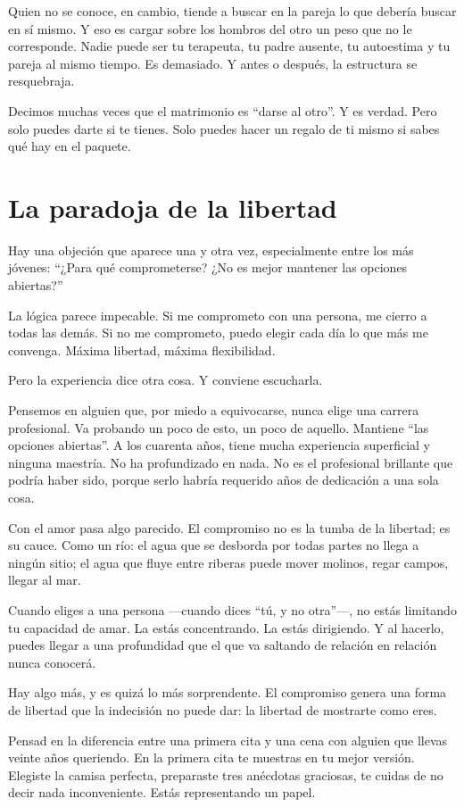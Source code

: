 Quien no se conoce, en cambio, tiende a buscar en la pareja lo que debería buscar en sí mismo. Y eso es cargar sobre los hombros del otro un peso que no le corresponde. Nadie puede ser tu terapeuta, tu padre ausente, tu autoestima y tu pareja al mismo tiempo. Es demasiado. Y antes o después, la estructura se resquebraja.

Decimos muchas veces que el matrimonio es ``darse al otro''. Y es verdad. Pero solo puedes darte si te tienes. Solo puedes hacer un regalo de ti mismo si sabes qué hay en el paquete.

\section{La paradoja de la libertad}

Hay una objeción que aparece una y otra vez, especialmente entre los más jóvenes: ``¿Para qué comprometerse? ¿No es mejor mantener las opciones abiertas?''

La lógica parece impecable. Si me comprometo con una persona, me cierro a todas las demás. Si no me comprometo, puedo elegir cada día lo que más me convenga. Máxima libertad, máxima flexibilidad.

Pero la experiencia dice otra cosa. Y conviene escucharla.

Pensemos en alguien que, por miedo a equivocarse, nunca elige una carrera profesional. Va probando un poco de esto, un poco de aquello. Mantiene ``las opciones abiertas''. A los cuarenta años, tiene mucha experiencia superficial y ninguna maestría. No ha profundizado en nada. No es el profesional brillante que podría haber sido, porque serlo habría requerido años de dedicación a una sola cosa.

Con el amor pasa algo parecido. El compromiso no es la tumba de la libertad; es su cauce. Como un río: el agua que se desborda por todas partes no llega a ningún sitio; el agua que fluye entre riberas puede mover molinos, regar campos, llegar al mar.

Cuando eliges a una persona ---cuando dices ``tú, y no otra''---, no estás limitando tu capacidad de amar. La estás concentrando. La estás dirigiendo. Y al hacerlo, puedes llegar a una profundidad que el que va saltando de relación en relación nunca conocerá.

Hay algo más, y es quizá lo más sorprendente. El compromiso genera una forma de libertad que la indecisión no puede dar: la libertad de mostrarte como eres.

Pensad en la diferencia entre una primera cita y una cena con alguien que llevas veinte años queriendo. En la primera cita te muestras en tu mejor versión. Elegiste la camisa perfecta, preparaste tres anécdotas graciosas, te cuidas de no decir nada inconveniente. Estás representando un papel.

